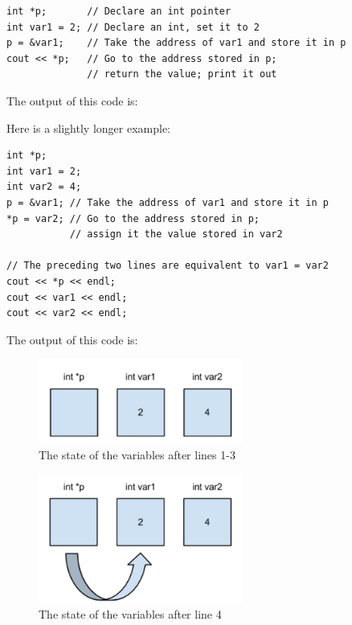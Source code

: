\noindent\begin{minipage}{\linewidth}\begin{lstlisting}
int *p;       // Declare an int pointer
int var1 = 2; // Declare an int, set it to 2
p = &var1;    // Take the address of var1 and store it in p
cout << *p;   // Go to the address stored in p;
              // return the value; print it out
\end{lstlisting}\end{minipage}

\noindent The output of this code is:

\noindent {}

Here is a slightly longer example:

\noindent\begin{minipage}{\linewidth}\begin{lstlisting}
int *p;
int var1 = 2;
int var2 = 4;
p = &var1; // Take the address of var1 and store it in p
*p = var2; // Go to the address stored in p; 
           // assign it the value stored in var2

// The preceding two lines are equivalent to var1 = var2
cout << *p << endl;
cout << var1 << endl;
cout << var2 << endl;
\end{lstlisting}\end{minipage}

The output of this code is:

\noindent {}

\noindent {}

\noindent {}

\begin{figure}[tb]
  \centering
  \includegraphics[width=0.6\textwidth]{diagrams/pointer-example-1.pdf}
  \caption{The state of the variables after lines 1-3} \label{fig:pointer-example-1} 
\end{figure}

\begin{figure}[tb]
  \centering
  \includegraphics[width=0.6\textwidth]{diagrams/pointer-example-2.pdf}
  \caption{The state of the variables after line 4} \label{fig:pointer-example-2} 
\end{figure}

